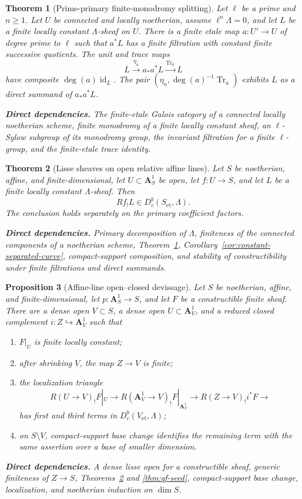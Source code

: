 \documentclass[10pt]{article}
\newtheorem{theorem}{Theorem}[section]
\newtheorem{proposition}[theorem]{Proposition}
\theoremstyle{definition}
\newcommand{\deps}[1]{\par\smallskip\noindent\textbf{Direct dependencies.} #1}
\begin{document}
\begin{theorem}[Prime-primary finite-monodromy splitting]
\label{thm:curve-lisse-descent}
Let $\ell$ be a prime and $n\geq1$.  Let $U$ be connected and locally
noetherian, assume $\ell^n\Lambda=0$, and let $L$ be a finite locally constant
$\Lambda$-sheaf on $U$.  There is a
finite etale map $a:U'\to U$ of degree prime to $\ell$ such that $a^*L$ has a
finite filtration with constant finite successive quotients.  The unit and
trace maps
\[
 L\xrightarrow{\eta_a}a_*a^*L
 \xrightarrow{\operatorname{Tr}_a}L
\]
have composite $\deg(a)\operatorname{id}_L$.  The pair
$(\eta_a,\deg(a)^{-1}\operatorname{Tr}_a)$ exhibits $L$ as a direct summand
of $a_*a^*L$.
\deps{The finite-etale Galois category of a connected locally noetherian
scheme, finite monodromy of a finite locally constant sheaf, an $\ell$-Sylow
subgroup of its monodromy group, the invariant filtration for a finite
$\ell$-group, and the finite-etale trace identity.}
\end{theorem}

\begin{theorem}[Lisse sheaves on open relative affine lines]
\label{thm:lisse-open-a1}
Let $S$ be noetherian, affine, and finite-dimensional, let
$U\subset\mathbf A^1_S$ be open, let $f:U\to S$, and let $L$ be a finite
locally constant $\Lambda$-sheaf.  Then
\[
 Rf_!L\in D_c^b(S_{\mathrm{et}},\Lambda).
\]
The conclusion holds separately on the primary coefficient factors.
\deps{Primary decomposition of $\Lambda$, finiteness of the connected
components of a noetherian scheme, Theorem~\ref{thm:curve-lisse-descent},
Corollary~\ref{cor:constant-separated-curve}, compact-support composition,
and stability of constructibility under finite filtrations and direct
summands.}
\end{theorem}

\begin{proposition}[Affine-line open--closed devissage]
\label{prop:noeth-devissage}
Let $S$ be noetherian, affine, and finite-dimensional, let
$p:\mathbf A^1_S\to S$, and let $F$ be a constructible finite sheaf.  There
are a dense open $V\subset S$, a dense open
$U\subset\mathbf A^1_V$, and a reduced closed complement
$i:Z\hookrightarrow\mathbf A^1_V$ such that
\begin{enumerate}
\item $F|_U$ is finite locally constant;
\item after shrinking $V$, the map $Z\to V$ is finite;
\item the localization triangle
\[
 R(U\to V)_!F|_U\longrightarrow
 R(\mathbf A^1_V\to V)_!F|_{\mathbf A^1_V}\longrightarrow
 R(Z\to V)_!i^*F\longrightarrow
\]
has first and third terms in $D_c^b(V_{\mathrm{et}},\Lambda)$;
\item on $S\setminus V$, compact-support base change identifies the remaining
term with the same assertion over a base of smaller dimension.
\end{enumerate}
\deps{A dense lisse open for a constructible sheaf, generic finiteness of
$Z\to S$, Theorems~\ref{thm:lisse-open-a1} and \ref{thm:qf-seed},
compact-support base change, localization, and noetherian induction on
$\dim S$.}
\end{proposition}
\end{document}
